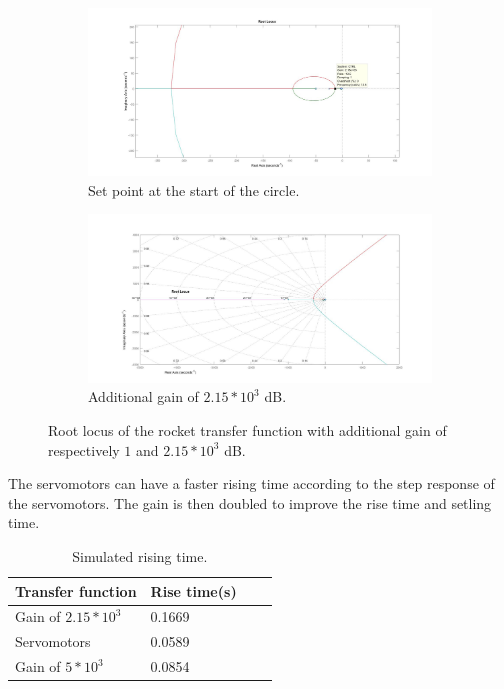 \begin{figure}[htbp]
	\centering
	\begin{subfigure}{0.45\textwidth}
		\includegraphics[width=\textwidth]{figures/Rocket/design/tf_with_controller_1_zoom}
		\caption{Set point at the start of the circle.}
		\label{fig:SystemC1C2Zoom}
	\end{subfigure}
	\begin{subfigure}{0.45\textwidth}
		\centering
		\includegraphics[width=\textwidth]{figures/Rocket/design/tf_with_controller_215}
		\caption{Additional gain of $2.15*10^3$ \si{\dB}.}
		\label{fig:SystemGain215}
	\end{subfigure}
	\caption{Root locus of the rocket transfer function with additional gain of respectively $1$ and $2.15*10^3$ \si{\dB}.}
\end{figure}


The servomotors can have a faster rising time according to the step response of the servomotors. The gain is then doubled to improve the rise time and setling time.

\begin{table}[htbp]
	\centering
	\caption{Simulated rising time.}
	\label{RPMData}
	\begin{tabular}{llll}
		Transfer function & Rise time{(}s{)} \\ \hline  \rowcolor{lightGrey}
		Gain of $2.15*10^3$     & 0.1669	\\  
		Servomotors     & 0.0589     \\  
		\rowcolor{lightGrey}           
		Gain of $5*10^3$     & 0.0854          \\     
	\end{tabular}
\end{table}

